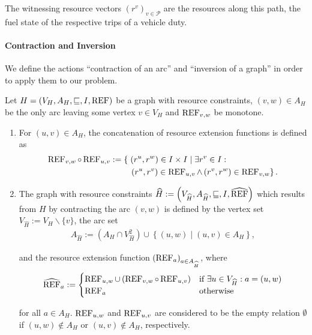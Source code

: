 The witnessing resource vectors $\left(r^v\right)_{v\in\mathcal{P}}$ are the resources along this path, \eg the fuel state of the respective trips of a vehicle duty.

\paragraph{Contraction and Inversion} \parfill

We define the actions \enquote{contraction of an arc} and \enquote{inversion of a graph} in order to apply them to our problem.

\begin{definition}[Contraction]
\label{def:contraction}

Let ${H=\left(V_H,A_H,\sqsubseteq,I,\operatorname{REF}\right)}$ be a graph with resource constraints, ${(v,w)\in A_H}$ be the only arc leaving some vertex $v\in V_H$ and $\operatorname{REF}_{v,w}$ be monotone.
\begin{enumerate}
	\item
For $(u,v)\in A_H$, the concatenation of resource extension functions is defined as
\begin{align*}
	\REF_{v,w}\circ\REF_{u,v} := \left\{\vphantom{\REF_{v,w}}\right. & \left(r^u,r^w\right)\in I\times I\mid \exists r^v\in I: \\
	& \left.\left(r^u,r^v\right)\in\REF_{u,v}\land\left(r^v,r^w\right)\in\REF_{v,w}\right\}.
\end{align*}
	\item
The graph with resource constraints ${\widehat{H} := \left(V_{\widehat{H}},A_{\widehat{H}},\sqsubseteq,I,\widehat{\operatorname{REF}}\right)}$ which results from $H$ by contracting the arc $(v,w)$ is defined by the vertex set ${V_{\widehat{H}} := V_H\backslash\{v\}}$, the arc set
\begin{align*}
	A_{\widehat{H}} := \left(A_H\cap V^2_{\widehat{H}}\right) \cup \left\{(u,w)\mid (u,v)\in A_H\right\},
\end{align*}

and the resource extension function ${\left(\operatorname{REF}_a\right)_{a\in A_{\widehat{H}}}}$, where
\begin{align*}
	\widehat{\operatorname{REF}}_a :=
	\begin{cases}
		\operatorname{REF}_{u,w}\cup\left(\operatorname{REF}_{v,w}\circ\operatorname{REF}_{u,v}\right) & \text{if } \exists u\in V_{\widehat{H}}: a=(u,w) \\
		\operatorname{REF}_a & \text{otherwise}
	\end{cases}
\end{align*}

for all ${a\in A_H}$. $\operatorname{REF}_{u,w}$ and $\operatorname{REF}_{u,v}$ are considered to be the empty relation $\emptyset$ if ${(u,w)\notin A_H}$ or ${(u,v)\notin A_H}$, respectively.

\end{enumerate}

\end{definition}

